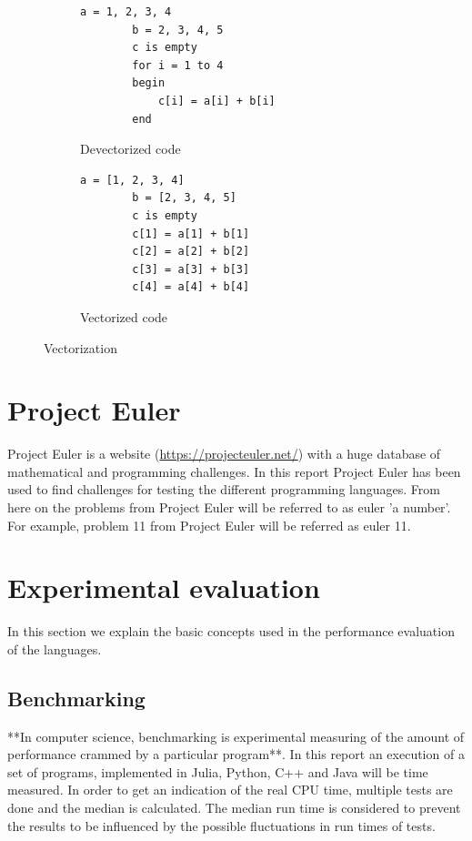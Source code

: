 \documentclass[a4paper, 11pt, titlepage]{article}
\begin{document}
\begin{figure}[H]
	\centering
	\begin{subfigure}[H]{0.7\textwidth}
		\centering
		\begin{lstlisting}[belowskip=0.5mm]
		a = 1, 2, 3, 4
		b = 2, 3, 4, 5
		c is empty
		for i = 1 to 4
		begin
			c[i] = a[i] + b[i]
		end
		\end{lstlisting}
		\caption{Devectorized code}
	\end{subfigure}
	\begin{subfigure}[H]{0.7\textwidth}
		\centering
		\begin{lstlisting}[belowskip=0.5mm]
		a = [1, 2, 3, 4]
		b = [2, 3, 4, 5]
		c is empty
		c[1] = a[1] + b[1]
		c[2] = a[2] + b[2]
		c[3] = a[3] + b[3]
		c[4] = a[4] + b[4]
		\end{lstlisting}
		\caption{Vectorized code}
	\end{subfigure}	
	\caption{Vectorization}
	\label{vec}
\end{figure}

\section{Project Euler}
Project Euler is a website (\url{https://projecteuler.net/}) with a huge database of mathematical and programming challenges. In this report Project Euler has been used to find challenges for testing the different programming languages. From here on the problems from Project Euler will be referred to as euler 'a number'. For example, problem 11 from Project Euler will be referred as euler 11.

\section{Experimental evaluation}
In this section we explain the basic concepts used in the performance evaluation of the languages.
\subsection{Benchmarking}
**In computer science, benchmarking is experimental measuring of the amount of performance crammed by a particular program**. In this report an execution of a set of programs, implemented in Julia, Python, C++ and Java will be time measured. In order to get an indication of the real CPU time, multiple tests are done and the median is calculated. The median run time is considered to prevent the results to be influenced by the possible fluctuations in run times of tests.
\end{document}
